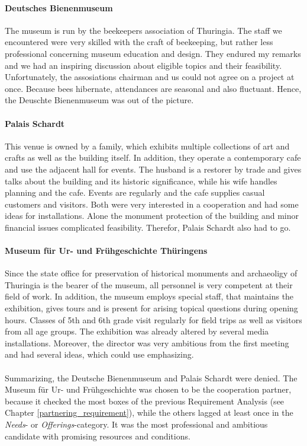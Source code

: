 \paragraph{Deutsches Bienenmuseum} 

The museum is run by the beekeepers association of Thuringia. The staff we encountered were very skilled with the craft of beekeeping, but rather less professional concerning museum education and design. They endured my remarks and we had an inspiring discussion about eligible topics and their feasibility. Unfortunately, the assosiations chairman and us could not agree on a project at once. Because bees hibernate, attendances are seasonal and also fluctuant. Hence, the Deuschte Bienenmuseum was out of the picture.

\paragraph{Palais Schardt} 

This venue is owned by a family, which exhibits multiple collections of art and crafts as well as the building itself. In addition, they operate a contemporary cafe and use the adjacent hall for events. The husband is a restorer by trade and gives talks about the building and its historic significance, while his wife handles planning and the cafe.  Events are regularly and the cafe supplies casual customers and visitors. Both were very interested in a cooperation and had some ideas for installations. Alone the monument protection of the building and minor financial issues complicated feasibility. Therefor, Palais Schardt also had to go.    

\paragraph{Museum für Ur- und Frühgeschichte Thüringens} 

Since the state office for preservation of historical monuments and archaeoligy of Thuringia is the bearer of the museum, all personnel is very competent at their field of work. In addition, the museum employs special staff, that maintains the exhibition, gives tours and is present for arising topical questions during opening hours. Classes of 5th and 6th grade visit regularly for field trips as well as visitors from all age groups. The exhibition was already altered by several media installations. Moreover, the director was very ambitious from the first meeting and had several ideas, which could use emphasizing.
\\
\\
Summarizing, the Deutsche Bienenmuseum and Palais Schardt were denied. The Museum für Ur- und Frühgeschichte was chosen to be the cooperation partner, because it checked the most boxes of the previous Requirement Analysis (see Chapter \ref{partnering_requirement}), while the others lagged at least once in the \textit{Needs}- or \textit{Offerings}-category. It was the most professional and ambitious candidate with promising resources and conditions.

